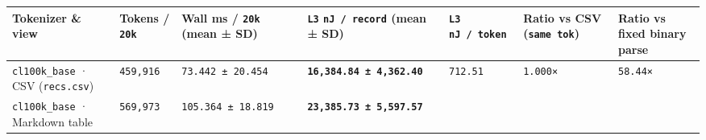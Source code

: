 \documentclass[10pt,letterpaper]{article}
\newcounter{none}
\begin{document}
{\def\LTcaptype{none} %
{\scriptsize\setlength{\tabcolsep}{3.0pt}\renewcommand{\arraystretch}{1.14}
\begin{longtable}[]{@{}
  >{\raggedright\arraybackslash}p{}
  >{\raggedleft\arraybackslash}p{}
  >{\raggedleft\arraybackslash}p{}
  >{\raggedleft\arraybackslash}p{}
  >{\raggedleft\arraybackslash}p{}
  >{\raggedleft\arraybackslash}p{}
  >{\raggedleft\arraybackslash}p{}@{}}
\toprule\noalign{}
\begin{minipage}[b]{\linewidth}\raggedright
\textbf{Tokenizer \& view}
\end{minipage} & \begin{minipage}[b]{\linewidth}\raggedleft
\textbf{Tokens / \texttt{20k}}
\end{minipage} & \begin{minipage}[b]{\linewidth}\raggedleft
\textbf{Wall ms / \texttt{20k} (mean ± SD)}
\end{minipage} & \begin{minipage}[b]{\linewidth}\raggedleft
\textbf{\texttt{L3} \texttt{nJ\ /\ record} (mean ± SD)}
\end{minipage} & \begin{minipage}[b]{\linewidth}\raggedleft
\textbf{\texttt{L3} \texttt{nJ\ /\ token}}
\end{minipage} & \begin{minipage}[b]{\linewidth}\raggedleft
\textbf{Ratio vs CSV (\texttt{same\ tok})}
\end{minipage} & \begin{minipage}[b]{\linewidth}\raggedleft
\textbf{Ratio vs fixed binary parse}
\end{minipage} \\
\midrule\noalign{}
\endhead
\bottomrule\noalign{}
\endlastfoot
\texttt{cl100k\_base} · CSV (\texttt{recs.csv}) & \texttt{459,916} &
\texttt{73.\allowbreak{}442\ ±\ 20.\allowbreak{}454} & \textbf{\texttt{16,\allowbreak{}384.\allowbreak{}84\ ±\ 4,\allowbreak{}362.\allowbreak{}40}} &
\texttt{712.51} & \texttt{1.000×} & \texttt{58.44×} \\
\texttt{cl100k\_base} · Markdown table & \texttt{569,973} &
\texttt{105.\allowbreak{}364\ ±\ 18.\allowbreak{}819} & \textbf{\texttt{23,\allowbreak{}385.\allowbreak{}73\ ±\ 5,\allowbreak{}597.\allowbreak{}57}} &

\end{longtable}}}
\end{document}
